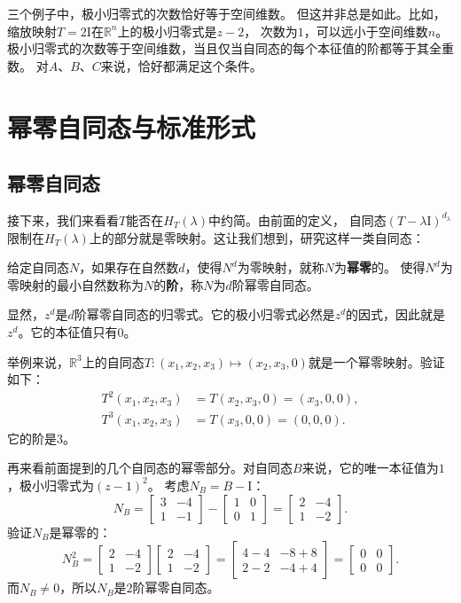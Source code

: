 \documentclass[12pt,UTF8,fontset=none]{ctexbook}
\begin{document}
三个例子中，极小归零式的次数恰好等于空间维数。
但这并非总是如此。比如，缩放映射$T = 2\mathrm{I}$在$\mathbb{R}^n$上的极小归零式是$z - 2$，
次数为$1$，可以远小于空间维数$n$。
极小归零式的次数等于空间维数，当且仅当自同态的每个本征值的阶都等于其全重数。
对$A$、$B$、$C$来说，恰好都满足这个条件。

\section{幂零自同态与标准形式}
\subsection{幂零自同态}
接下来，我们来看看$T$能否在$H_T(\lambda)$中约简。由前面的定义，
自同态$(T - \lambda\mathrm{I})^{d_\lambda}$限制在$H_T(\lambda)$上的部分就是零映射。这让我们想到，研究这样一类自同态：
\begin{df}\label{df:6_4_4}
    给定自同态$N$，如果存在自然数$d$，使得$N^d$为零映射，就称$N$为\textbf{幂零}的。
    使得$N^d$为零映射的最小自然数称为$N$的\textbf{阶}，称$N$为$d$阶幂零自同态。
\end{df}

显然，$z^d$是$d$阶幂零自同态的归零式。它的极小归零式必然是$z^d$的因式，因此就是$z^d$。它的本征值只有0。

举例来说，$\mathbb{R}^3$上的自同态$T: (x_1, x_2, x_3) \mapsto (x_2, x_3, 0)$就是一个幂零映射。验证如下：
\begin{align*}
    T^2(x_1, x_2, x_3) &= T(x_2, x_3, 0) = (x_3, 0, 0),  \\
    T^3(x_1, x_2, x_3) &= T(x_3, 0, 0) =  (0, 0, 0).
\end{align*}
它的阶是3。

再来看前面提到的几个自同态的幂零部分。对自同态$B$来说，它的唯一本征值为$1$，极小归零式为$(z-1)^2$。
考虑$N_B = B - \mathrm{I}$：
$$
N_B = \begin{bmatrix} 3 & -4 \\ 1 & -1 \end{bmatrix} - \begin{bmatrix} 1 & 0 \\ 0 & 1 \end{bmatrix} = \begin{bmatrix} 2 & -4 \\ 1 & -2 \end{bmatrix}.
$$
验证$N_B$是幂零的：
$$
N_B^2 = \begin{bmatrix} 2 & -4 \\ 1 & -2 \end{bmatrix}\begin{bmatrix} 2 & -4 \\ 1 & -2 \end{bmatrix} = \begin{bmatrix} 4-4 & -8+8 \\ 2-2 & -4+4 \end{bmatrix} = \begin{bmatrix} 0 & 0 \\ 0 & 0 \end{bmatrix}.
$$
而$N_B \neq 0$，所以$N_B$是$2$阶幂零自同态。
\end{document}
